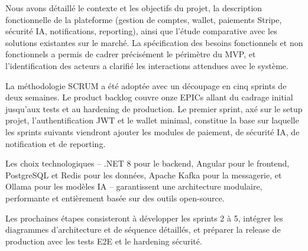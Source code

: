 \documentclass[12pt,a4paper]{report}
\begin{document}
Nous avons détaillé le contexte et les objectifs du projet, la description fonctionnelle de la plateforme (gestion de comptes, wallet, paiements Stripe, sécurité IA, notifications, reporting), ainsi que l'étude comparative avec les solutions existantes sur le marché. La spécification des besoins fonctionnels et non fonctionnels a permis de cadrer précisément le périmètre du MVP, et l'identification des acteurs a clarifié les interactions attendues avec le système.

La méthodologie SCRUM a été adoptée avec un découpage en cinq sprints de deux semaines. Le product backlog couvre onze EPICs allant du cadrage initial jusqu'aux tests et au hardening de production. Le premier sprint, axé sur le setup projet, l'authentification JWT et le wallet minimal, constitue la base sur laquelle les sprints suivants viendront ajouter les modules de paiement, de sécurité IA, de notification et de reporting.

Les choix technologiques -- .NET 8 pour le backend, Angular pour le frontend, PostgreSQL et Redis pour les données, Apache Kafka pour la messagerie, et Ollama pour les modèles IA -- garantissent une architecture modulaire, performante et entièrement basée sur des outils open-source.

Les prochaines étapes consisteront à développer les sprints 2 à 5, intégrer les diagrammes d'architecture et de séquence détaillés, et préparer la release de production avec les tests E2E et le hardening sécurité.
\end{document}
